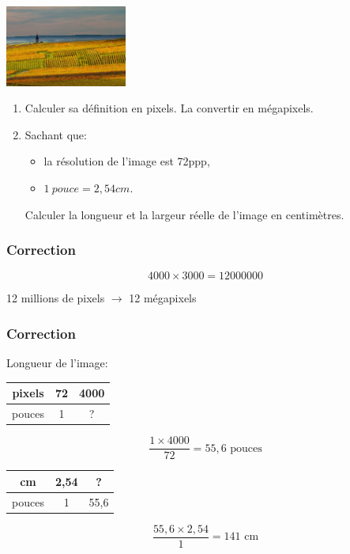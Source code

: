 \documentclass[svgnames,11pt]{beamer}
\begin{document}
\begin{frame}
    \frametitle{}

    \begin{activite}
        \begin{center}
            \centering
            \includegraphics[width=4cm]{ressources/vigne.jpg}
            \label{IMG}
        \end{center}
        \begin{enumerate}
            \item Calculer sa définition en pixels. La convertir en mégapixels.
            \item Sachant que:
                  \begin{itemize}
                      \item la résolution de l'image est 72ppp,
                      \item $1~pouce = 2,54cm$.
                  \end{itemize}
                  Calculer la longueur et la largeur réelle de l'image en centimètres.
        \end{enumerate}
    \end{activite}

\end{frame}
\begin{frame}
    \frametitle{Correction}

    $$4000×3000=12000000$$
    \begin{center}
        12 millions de pixels $\rightarrow$ 12 mégapixels
    \end{center}

\end{frame}
\begin{frame}[fragile]
    \frametitle{Correction}
    Longueur de l'image:
    \begin{center}
        \begin{tabular}{|*{3}{c|}}
            \hline
            pixels & 72 & 4000 \\
            \hline
            pouces & 1  & ?    \\
            \hline
        \end{tabular}
    \end{center}
    $$\frac{1×4000}{72}=55,6\mbox{ pouces}$$
    \begin{center}
        \begin{tabular}{|*{3}{c|}}
            \hline
            cm     & 2,54 & ?    \\
            \hline
            pouces & 1    & 55,6 \\
            \hline
        \end{tabular}
    \end{center}
    $$\frac{55,6×2,54}{1}=141\mbox{ cm}$$
\end{frame}
\end{document}
